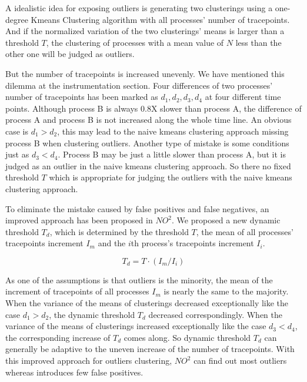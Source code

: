 A idealistic idea for exposing outliers is generating two clusterings using a one-degree Kmeans
Clustering algorithm with all processes' number of tracepoints. And if the normalized
variation of the two clusterings' means is larger than a threshold $T$, the clustering of
processes with a mean value of $N$ less than the other one will be judged as outliers.

But the number of tracepoints is increased unevenly. We have mentioned this dilemma at the
instrumentation section. Four differences of two processes' number of tracepoints has been
marked as $d_1, d_2, d_3, d_4$ at four different time points. Although process B is always
0.8X slower than process A, the difference of process A and process B is not increased
along the whole time line. An obvious case is $d_1 > d_2$, this may lead to the naive
kmeans clustering approach missing process B when clustering outliers. Another type of
mistake is some conditions just as $d_3 < d_4$. Process B may be just a little slower than
process A, but it is judged as an outlier in the naive kmeans clustering approach. So there no
fixed threshold $T$ which is appropriate for judging the outliers with the naive kmeans
clustering approach.

To eliminate the mistake caused by false positives and false negatives, an improved approach
has been proposed in $NO^2$. We proposed a new dynamic threshold $T_d$, which is
determined by the threshold $T$, the mean of all processes' tracepoints increment $I_m$
and the $i$th process's tracepoints increment $I_i$.

$$T_d = T \cdot (I_m / I_i)$$

As one of the assumptions is that outliers is the minority, the mean of the increment of
tracepoints of all processes $I_m$ is nearly the same to the majority. When the variance
of the means of clusterings decreased exceptionally like the case $d_1 > d_2$, the dynamic
threshold $T_d$ decreased correspondingly. When the variance of the means of clusterings
increased exceptionally like the case $d_3 < d_4$, the corresponding increase of $T_d$
comes along. So dynamic threshold $T_d$ can generally be adaptive to the uneven increase of the number
of tracepoints. With this improved approach for outliers clustering, $NO^2$
can find out most outliers whereas introduces few false positives. 
